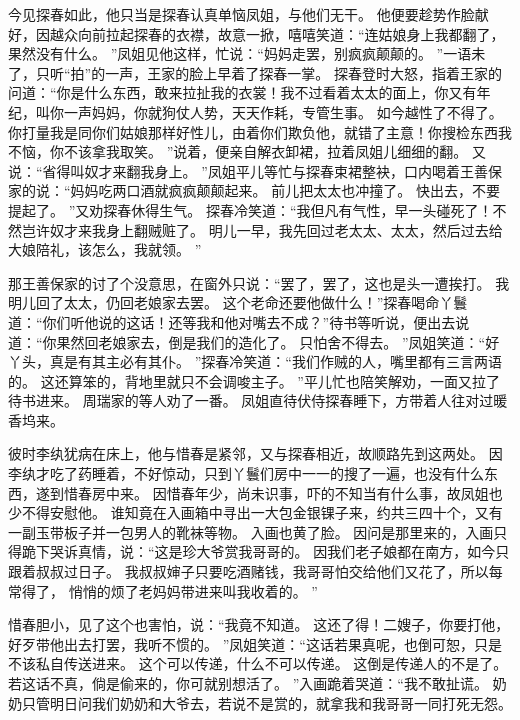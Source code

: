 今见探春如此，他只当是探春认真单恼凤姐，与他们无干。
他便要趁势作脸献好，因越众向前拉起探春的衣襟，故意一掀，嘻嘻笑道：“连姑娘身上我都翻了，果然没有什么。
”凤姐见他这样，忙说：“妈妈走罢，别疯疯颠颠的。
”一语未了，只听“拍”的一声，王家的脸上早着了探春一掌。
探春登时大怒，指着王家的问道：“你是什么东西，敢来拉扯我的衣裳！我不过看着太太的面上，你又有年纪，叫你一声妈妈，你就狗仗人势，天天作耗，专管生事。
如今越性了不得了。
你打量我是同你们姑娘那样好性儿，由着你们欺负他，就错了主意！你搜检东西我不恼，你不该拿我取笑。
”说着，便亲自解衣卸裙，拉着凤姐儿细细的翻。
又说：“省得叫奴才来翻我身上。
”凤姐平儿等忙与探春束裙整袂，口内喝着王善保家的说：“妈妈吃两口酒就疯疯颠颠起来。
前儿把太太也冲撞了。
快出去，不要提起了。
”又劝探春休得生气。
探春冷笑道：“我但凡有气性，早一头碰死了！不然岂许奴才来我身上翻贼赃了。
明儿一早，我先回过老太太、太太，然后过去给大娘陪礼，该怎么，我就领。
”\par
那王善保家的讨了个没意思，在窗外只说：“罢了，罢了，这也是头一遭挨打。
我明儿回了太太，仍回老娘家去罢。
这个老命还要他做什么！”探春喝命丫鬟道：“你们听他说的这话！还等我和他对嘴去不成？”待书等听说，便出去说道：“你果然回老娘家去，倒是我们的造化了。
只怕舍不得去。
”凤姐笑道：“好丫头，真是有其主必有其仆。
”探春冷笑道：“我们作贼的人，嘴里都有三言两语的。
这还算笨的，背地里就只不会调唆主子。
”平儿忙也陪笑解劝，一面又拉了待书进来。
周瑞家的等人劝了一番。
凤姐直待伏侍探春睡下，方带着人往对过暖香坞来。
\par
彼时李纨犹病在床上，他与惜春是紧邻，又与探春相近，故顺路先到这两处。
因李纨才吃了药睡着，不好惊动，只到丫鬟们房中一一的搜了一遍，也没有什么东西，遂到惜春房中来。
因惜春年少，尚未识事，吓的不知当有什么事，故凤姐也少不得安慰他。
谁知竟在入画箱中寻出一大包金银锞子来，约共三四十个，又有一副玉带板子并一包男人的靴袜等物。
入画也黄了脸。
因问是那里来的，入画只得跪下哭诉真情，说：“这是珍大爷赏我哥哥的。
因我们老子娘都在南方，如今只跟着叔叔过日子。
我叔叔婶子只要吃酒赌钱，我哥哥怕交给他们又花了，所以每常得了，
悄悄的烦了老妈妈带进来叫我收着的。
”\par
惜春胆小，见了这个也害怕，说：“我竟不知道。
这还了得！二嫂子，你要打他，好歹带他出去打罢，我听不惯的。
”凤姐笑道：“这话若果真呢，也倒可恕，只是不该私自传送进来。
这个可以传递，什么不可以传递。
这倒是传递人的不是了。
若这话不真，倘是偷来的，你可就别想活了。
”入画跪着哭道：“我不敢扯谎。
奶奶只管明日问我们奶奶和大爷去，若说不是赏的，就拿我和我哥哥一同打死无怨。
